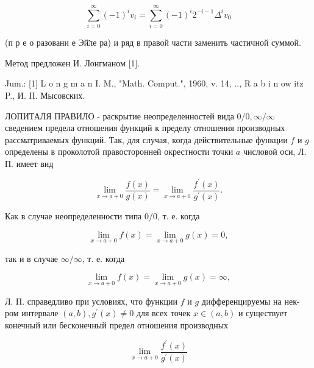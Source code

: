 \documentclass[10pt]{article}
\begin{document}
\[

\sum_{i=0}^{\infty}(-1)^{i} v_{i}=\sum_{i=0}^{\infty}(-1)^{i} 2^{-i-1} \Delta^{i} v_{0}

\]



(п р е о разовани е Эй̈ле ра) и ряд в правой части заменить частичной суммой.



Метод предложен И. Лонгманом [1].



Jum.: [1] L o n g m a n I. M., "Math. Comput.", 1960, v. 14, .., R a b i n ow itz P., И. П. Мысовских.



ЛОПИТАЛЯ ПРАВИЛО - раскрытие неопределенностей вида $0 / 0, \infty / \infty$ сведением предела отношения функций к пределу отношения производных рассматриваемых функций. Так, для случая, когда действительные функции $f$ и $g$ определены в проколотой правосторонней окрестности точки $a$ числовой оси, Л. П. имеет вид



\[

\lim _{x \rightarrow a+0} \frac{f(x)}{g(x)}=\lim _{x \rightarrow a+0} \frac{f^{\prime}(x)}{g^{\prime}(x)} .

\]



Как в случае неопределенности типа $0 / 0$, т. е. когда



\[

\lim _{x \rightarrow a+0} f(x)=\lim _{x \rightarrow a+0} g(x)=0,

\]



так и в случае $\infty / \infty$, т. е. когда



\[

\lim _{x \rightarrow a+0} f(x)=\lim _{x \rightarrow a+0} g(x)=\infty,

\]



Л. П. справедливо при условиях, что функции $f$ и $g$ дифференцируемы на нек-ром интервале $(a, b), g^{\prime}(x) \neq 0$ для всех точек $x \in(a, b)$ и существует конечный или бесконечный предел отношения производных



\[

\lim _{x \rightarrow a+0} \frac{f^{\prime}(x)}{g^{\prime}(x)}

\]
\end{document}
